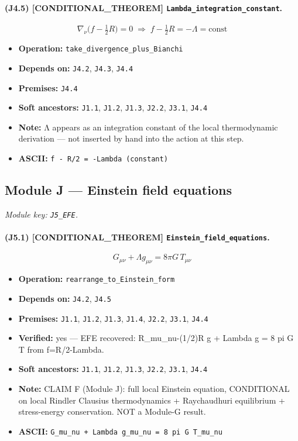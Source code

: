\documentclass[11pt,a4paper]{article}
\theoremstyle{remark}\newtheorem*{caution}{Caution}
\newcommand{\tagbox}[1]{\textsc{[#1]}}
\begin{document}
\paragraph{(J4.5) \tagbox{CONDITIONAL\_THEOREM} \texttt{Lambda\_integration\_constant}.}
\begin{equation}
\nabla_\nu\bigl(f-\tfrac12 R\bigr)=0\;\Rightarrow\;f-\tfrac12 R=-\Lambda=\mathrm{const}
\tag{J4.5}
\end{equation}
\begin{itemize}\setlength{\itemsep}{0.12em}
\item \textbf{Operation:} \texttt{take\_divergence\_plus\_Bianchi}
\item \textbf{Depends on:} \texttt{J4.2}, \texttt{J4.3}, \texttt{J4.4}
\item \textbf{Premises:} \texttt{J4.4}
\item \textbf{Soft ancestors:} \texttt{J1.1}, \texttt{J1.2}, \texttt{J1.3}, \texttt{J2.2}, \texttt{J3.1}, \texttt{J4.4}
\item \textbf{Note:} Λ appears as an integration constant of the local thermodynamic derivation — not inserted by hand into the action at this step.
\item \textbf{ASCII:} \texttt{f - R/2 = -Lambda (constant)}
\end{itemize}
\subsection{Module J --- Einstein field equations}
\textit{Module key: \texttt{J5\_EFE}.}
\paragraph{(J5.1) \tagbox{CONDITIONAL\_THEOREM} \texttt{Einstein\_field\_equations}.}
\begin{equation}
\boxed{G_{\mu\nu}+\Lambda g_{\mu\nu}=8\pi G\,T_{\mu\nu}}
\tag{J5.1}
\end{equation}
\begin{itemize}\setlength{\itemsep}{0.12em}
\item \textbf{Operation:} \texttt{rearrange\_to\_Einstein\_form}
\item \textbf{Depends on:} \texttt{J4.2}, \texttt{J4.5}
\item \textbf{Premises:} \texttt{J1.1}, \texttt{J1.2}, \texttt{J1.3}, \texttt{J1.4}, \texttt{J2.2}, \texttt{J3.1}, \texttt{J4.4}
\item \textbf{Verified:} yes --- EFE recovered: R\_mu\_nu-(1/2)R g + Lambda g = 8 pi G T from f=R/2-Lambda.
\item \textbf{Soft ancestors:} \texttt{J1.1}, \texttt{J1.2}, \texttt{J1.3}, \texttt{J2.2}, \texttt{J3.1}, \texttt{J4.4}
\item \textbf{Note:} CLAIM F (Module J): full local Einstein equation, CONDITIONAL on local Rindler Clausius thermodynamics + Raychaudhuri equilibrium + stress-energy conservation. NOT a Module-G result.
\item \textbf{ASCII:} \texttt{G\_mu\_nu + Lambda g\_mu\_nu = 8 pi G T\_mu\_nu}
\end{itemize}
\end{document}

